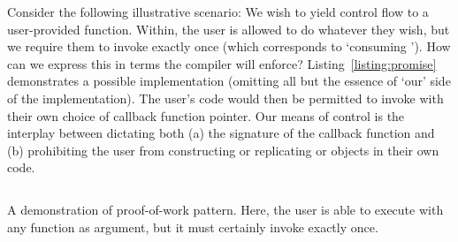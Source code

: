 Consider the following illustrative scenario: We wish to yield control flow to a user-provided function. Within, the user is allowed to do whatever they wish, but we require them to invoke   exactly once (which corresponds to `consuming '). How can we express this in terms the compiler will enforce? Listing~\ref{listing:promise} demonstrates a possible implementation (omitting all but the essence of `our' side of the implementation). The user's code would then be permitted to invoke  with their own choice of callback function pointer. Our means of control is the interplay between dictating both (a)
the signature of the callback function and (b) prohibiting the user from constructing or replicating  or  objects in their own code.

\begin{listing}[ht]
	\inputminted[]{rust}{promise.rs}
	\caption[Proof of work pattern example of `promises'.]{A demonstration of proof-of-work pattern. Here, the user is able to execute  with any function as argument, but it must certainly invoke  exactly once.}
	\label{listing:promise}
\end{listing}

